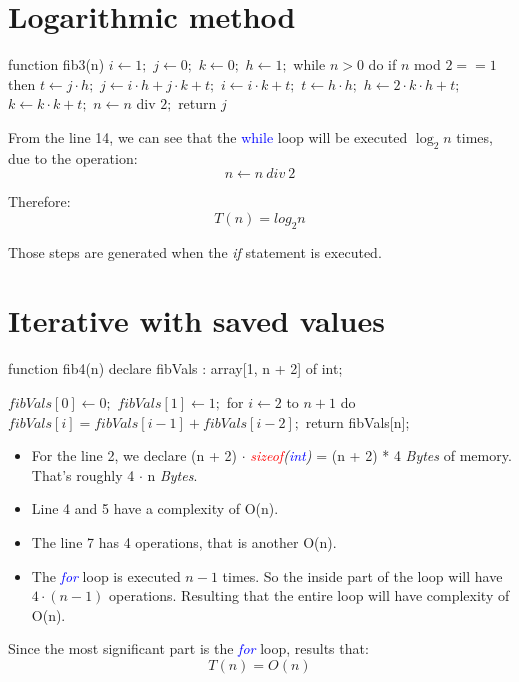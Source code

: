\documentclass{article}
\begin{document}

	\newpage
	\section{Logarithmic method}
		\begin{algorithm}[caption={Logarithmic method}, label={Fibonacci3}]
function fib3(n)
	$i \leftarrow 1;$
	$j \leftarrow 0;$
	$k \leftarrow 0;$
	$h \leftarrow 1;$
	while $n > 0$ do
		if $n$ mod $2 == 1$ then
			$t \leftarrow j \cdot h;$
			$j \leftarrow i \cdot h + j \cdot k + t;$
			$i \leftarrow i \cdot k + t;$
		$t \leftarrow h \cdot h;$
		$h \leftarrow 2 \cdot k \cdot h + t;$
		$k \leftarrow k \cdot k + t;$
		$n \leftarrow n$ div $2;$
	return $j$
		\end{algorithm}

		\par From the line 14, we can see that the \textcolor{blue}{while} loop will be executed $\log_2 n$ times, due to the operation:
		\[
			n \leftarrow n \ div \ 2
		\]
		\par Therefore:
		\[
			T(n) = log_2 n
		\]


		\begin{center}
			Those steps are generated when the \textit{if} statement is executed.
		\end{center}

	\newpage
	\section{Iterative with saved values}
		\begin{algorithm}[caption = {Iterative with saved values}, label = {Fibonacci4}]
function fib4(n)
	declare fibVals : array[1, n + 2] of int;

	$fibVals[0] \leftarrow 0;$
	$fibVals[1] \leftarrow 1;$
	for $i \leftarrow 2$ to $n + 1$ do
		$fibVals[i] = fibVals[i - 1] + fibVals[i - 2];$
	return fibVals[n];
		\end{algorithm}

		\begin{itemize}
			\item For the line 2, we declare (n + 2) $\cdot$ \textit{\textcolor{red}{sizeof}(\textcolor{blue}{int})} = (n + 2) * 4 \textit{Bytes} of memory. That's roughly 4 $\cdot$ n \textit{Bytes}.
			\item Line 4 and 5 have a complexity of O(n).
			\item The line 7 has 4 operations, that is another O(n).
			\item The \textcolor{blue}{\textit{for}} loop is executed $n - 1$ times. So the inside part of the loop will have $4 \cdot (n - 1)$ operations. Resulting that the entire loop will have complexity of O(n).
		\end{itemize}
		\par Since the most significant part is the \textcolor{blue}{\textit{for}} loop, results that:
		\[
			T(n) = O(n)
		\]
\end{document}
